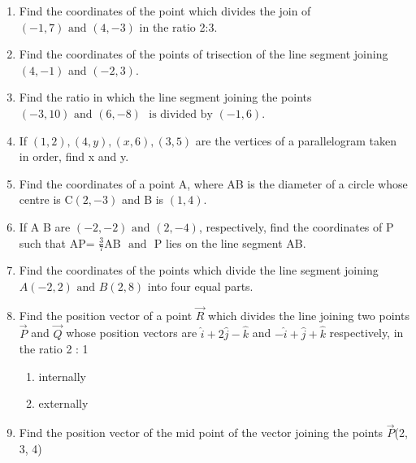 \begin{enumerate}[label=\thesubsection.\arabic*,ref=\thesubsection.\theenumi]

\item Find the coordinates of the point which divides the join of $(-1,7) \text{ and } (4,-3)$ in the ratio 2:3.
	\\
		\solution
	
\item Find the coordinates of the points of trisection of the line segment joining $(4,-1)$  and  $(-2,3)$.
	\\
		\solution
	
\item Find the ratio in which the line segment joining the points $(-3,10) \text{ and } (6,-8)$ $\text{ is divided by } (-1,6)$.
	\\
		\solution
	
\item If $(1,2), (4,y), (x,6), (3,5)$ are the vertices of a parallelogram taken in order, find x and y.
	\\
		\solution
	
\item Find the coordinates of a point A, where AB is the diameter of a circle whose centre is C$ (2,-3)$  and  B is $(1,4)$.
	\\
		\solution
	
\item If A  B are $(-2,-2) \text{ and } (2,-4)$, respectively, find the coordinates of P such that AP= $\frac {3}{7}$AB $\text{ and }$ P lies on the line segment AB.
	\\
		\solution
	
\item Find the coordinates of the points which divide the line segment joining $A(-2,2) \text{ and } B(2,8)$ into four equal parts.
	\\
		\solution
	
\item Find the position vector of a point $\vec{R}$ which divides the line joining two points $\vec{P}$
and $\vec{Q}$ whose position vectors are $\hat{i}+2\hat{j}-\hat{k}$ and $-\hat{i}+\hat{j}+\hat{k}$ respectively, in the
ratio 2 : 1
\begin{enumerate}
    \item  internally
    \item  externally
\end{enumerate}
\solution
		
\item Find the position vector of the mid point of the vector joining the points $\vec{P}$(2, 3, 4)

\end{enumerate}
